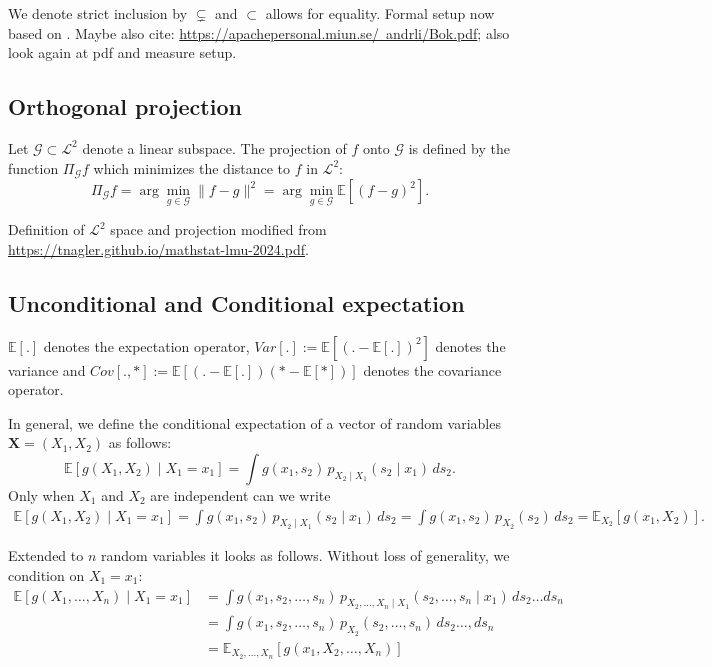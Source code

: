 We denote strict inclusion by $\subsetneq$ and $\subset$ allows for equality.
Formal setup now based on \cite{chastaing2012,rahman2014}.
{\color{blue} Maybe also cite: \href{https://apachepersonal.miun.se/~andrli/Bok.pdf}{https://apachepersonal.miun.se/~andrli/Bok.pdf}; also look again at pdf and measure setup.}

\subsection*{Orthogonal projection}
Let $\mathcal{G} \subset \mathcal{L}^2$ denote a linear subspace. The projection of $f$ onto $\mathcal{G}$ is defined by the function $\Pi_{\mathcal{G}}f$ which minimizes the distance to $f$ in $\mathcal{L}^2$:
\[
\Pi_{\mathcal{G}}f = \arg\min_{g \in \mathcal{G}} \|f - g\|^2
= \arg\min_{g \in \mathcal{G}} \mathbb{E}[(f - g)^2].
\]

Definition of $\mathcal{L}^2$ space and projection modified from \href{https://tnagler.github.io/mathstat-lmu-2024.pdf}{https://tnagler.github.io/mathstat-lmu-2024.pdf}.



\subsection*{Unconditional and Conditional expectation}
$\mathbb{E}[.]$ denotes the expectation operator, $Var[.] := \mathbb{E}[(. - \mathbb{E}[.])^2]$ denotes the variance and $Cov[.,*] := \mathbb{E}[(. - \mathbb{E}[.]) (* - \mathbb{E}[*])]$ denotes the covariance operator.\par
In general, we define the conditional expectation of a vector of random variables $\boldsymbol{X} = (X_1, X_2)$ as follows:
\[
\mathbb{E}[g(X_1, X_2) \mid X_1 = x_1] = \int g(x_1, s_2) \, p_{X_2 \mid X_1}(s_2 \mid x_1) \, ds_2.
\]
Only when $X_1$ and $X_2$ are independent can we write
\begin{align*}
    \mathbb{E}[g(X_1, X_2) \mid X_1 = x_1] = \int g(x_1, s_2) \, p_{X_2 \mid X_1}(s_2 \mid x_1) \, ds_2 = \int g(x_1, s_2) \, p_{X_2}(s_2) \, ds_2 = \mathbb{E}_{X_2}[g(x_1, X_2)].
\end{align*}

Extended to $n$ random variables it looks as follows. Without loss of generality, we condition on $X_1 = x_1$:
\begin{align*}
    \mathbb{E}[g(X_1, \dots, X_n) \mid X_1 = x_1] &= \int g(x_1, s_2, \dots, s_n) \, p_{X_2, \dots, X_n \mid X_1}(s_2, \dots, s_n \mid x_1) \, ds_2 \dots ds_n \\
    &= \int g(x_1, s_2, \dots, s_n) \, p_{X_2}(s_2, \dots, s_n) \, ds_2 \dots, ds_n \\
    &= \mathbb{E}_{X_2, \dots, X_n}[g(x_1, X_2, \dots, X_n)]
\end{align*}



